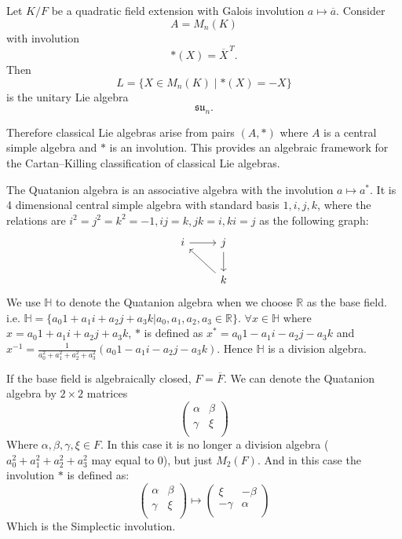 \documentclass[11pt, a4paper]{report}
\begin{document}
    \begin{example}
    Let $K/F$ be a quadratic field extension with Galois involution
    $a\mapsto \overline{a}$.  Consider
    \[
    A=M_n(K)
    \]
    with involution
    \[
    *(X)=\overline{X}^{\,T}.
    \]
    Then
    \[
    L=\{X\in M_n(K)\mid *(X)=-X\}
    \]
    is the unitary Lie algebra
    \[
    \mathfrak{su}_n .
    \]
    \end{example}
    
    Therefore classical Lie algebras arise from pairs $(A,*)$ where
    $A$ is a central simple algebra and $*$ is an involution.  This
    provides an algebraic framework for the Cartan--Killing classification
    of classical Lie algebras.

\begin{example}
 The Quatanion algebra is an associative algebra with the involution $ a \mapsto a^* $. It is 4 dimensional central simple algebra with standard basis $ 1,i,j,k $, where the relations are $ i^2 = j^2 = k^2  = -1, ij=k, jk=i, ki=j $ as the following graph:
 \[
    \begin{tikzcd}
        i \arrow[r] & j \arrow[d]  \\
                    & k \arrow[lu]
        \end{tikzcd}
 \]
  We use $ \mathbb{H} $ to denote the Quatanion algebra when we choose $ \mathbb{R} $ as the base field. i.e. $ \mathbb{H}=\{ a_0 1 + a_1 i + a_2 j + a_3 k | a_0,a_1,a_2,a_3 \in \mathbb{R} \} $. $ \forall x \in \mathbb{H} $ where $ x=a_0 1 + a_1 i + a_2 j + a_3 k $, $ * $ is defined as $ x^* = a_0 1 - a_1 i - a_2 j - a_3 k $ and $ x^{-1}= \frac{1}{a_0^2 + a_1^2 + a_2^2 + a_3^2} (a_0 1 - a_1 i - a_2 j - a_3 k) $. Hence $ \mathbb{H} $ is a division algebra. 
 
 If the base field is algebraically closed, $F =\overline{F}$. We can denote the Quatanion algebra by $ 2 \times 2 $ matrices 
 \[
 \begin{pmatrix}
    \alpha & \beta \\
    \gamma & \xi \\
 \end{pmatrix}
 \]    
Where $ \alpha, \beta, \gamma, \xi \in F $. In this case it is no longer a division algebra ($a_0^2 + a_1^2 + a_2^2 + a_3^2$ may equal to 0), but just $ M_2(F) $. And in this case the involution $ * $ is defined as:
\[
\begin{pmatrix}
    \alpha & \beta \\
    \gamma & \xi \\
 \end{pmatrix}
 \mapsto
 \begin{pmatrix}
    \xi & -\beta \\
    -\gamma & \alpha \\
 \end{pmatrix}
\]   
Which is the Simplectic involution.
\end{example}
\end{document}
